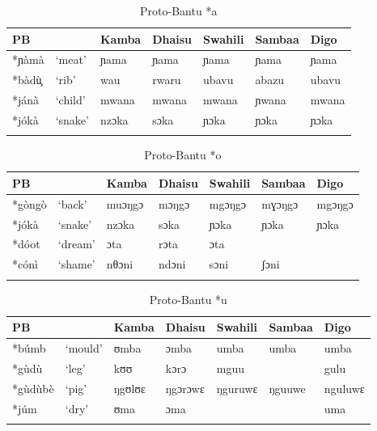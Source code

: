 \documentclass[output=paper,colorlinks,citecolor=brown]{langscibook}
\begin{document}
\begin{table}
    \caption{Proto-Bantu *a}
    \label{tab:ngonyani:9}
    \begin{tabular}{@{}p{1cm} p{1.3cm} p{1.3cm} p{1.3cm} p{1.3cm} p{1.3cm} p{1.3cm}@{}}
    \lsptoprule
        PB & & Kamba & Dhaisu & Swahili & Sambaa & Digo \\
        \midrule
        *ɲàmà & `meat' & ɲama & ɲama   &ɲama  & ɲama  & ɲama  \\
        *bàdù̧  & `rib' & wau & rwaru  & ubavu & abazu & ubavu\\
        *jánà & `child' & mwana & mwana & mwana & ɲwana &  mwana\\
        *jókà & `snake' & nzɔka & sɔka & ɲɔka & ɲɔka &  ɲɔka\\
    \lspbottomrule
    \end{tabular}
\end{table}

\begin{table}
    \caption{Proto-Bantu *o}
    \label{tab:ngonyani:10}
    \begin{tabular}{@{}p{1cm} p{1.3cm} p{1.3cm} p{1.3cm} p{1.3cm} p{1.3cm} p{1.3cm}@{}}
    \lsptoprule
        PB & & Kamba & Dhaisu & Swahili & Sambaa & Digo \\
        \midrule
        *gòngò & `back' & muɔŋgɔ & mɔŋgɔ  & mgɔŋgɔ & mɣɔŋgɔ  & mgɔŋgɔ\\
        *jókà & `snake' & nzɔka & sɔka & ɲɔka & ɲɔka & ɲɔka \\
        *dóot & `dream' & ɔta & rɔta & ɔta & & \\
        *cónì & `shame' & nθɔni & ndɔni & sɔni & ʃɔni &  \\
    \lspbottomrule
    \end{tabular}
\end{table}

\begin{table}
    \caption{Proto-Bantu *u}
    \label{tab:ngonyani:11}
    \begin{tabular}{@{}p{1cm} p{1.3cm} p{1.3cm} p{1.3cm} p{1.3cm} p{1.3cm} p{1.3cm}@{}}
    \lsptoprule
        PB & & Kamba & Dhaisu & Swahili & Sambaa & Digo \\
        \midrule
        *búmb & `mould' & ʊmba & ɔmba  & umba &  umba & umba\\
        *gùdù  & `leg' & kʊʊ & kɔrɔ & mguu & & gulu\\
        *gùdùbè & `pig' & ŋgʊlʊɛ & ŋgɔrɔwɛ & ŋguruwɛ & ŋguuwe & nguluwɛ\\
        *júm & `dry' & ʊma & ɔma &  &  & uma\\
    \lspbottomrule
    \end{tabular}
\end{table}
\end{document}
